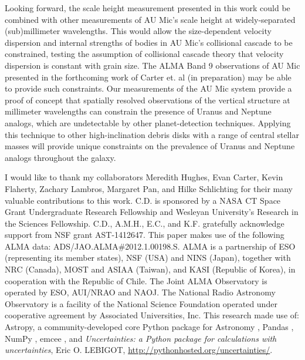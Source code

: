 \documentclass[12pt,oneside]{book}
\begin{document}
Looking forward, the scale height measurement presented in this work could be combined with other measurements of AU Mic's scale height at widely-separated (sub)millimeter wavelengths.
This would allow the size-dependent velocity dispersion and internal strengths of bodies in AU Mic's collisional cascade to be constrained, testing the assumption of collisional cascade theory that velocity dispersion is constant with grain size.
The ALMA Band 9 observations of AU Mic presented in the forthcoming work of Carter et. al (in preparation) may be able to provide such constraints.
Our measurements of the AU Mic system provide a proof of concept that spatially resolved observations of the vertical structure at millimeter wavelengths can constrain the presence of Uranus and Neptune analogs, which are undetectable by other planet-detection techniques.  
Applying this technique to other high-inclination debris disks with a range of central stellar masses will provide unique constraints on the prevalence of Uranus and Neptune analogs throughout the galaxy.

\medskip
\bigskip\bigskip
\bigskip
I would like to thank my collaborators Meredith Hughes, Evan Carter, Kevin Flaherty, Zachary Lambros, Margaret Pan, and Hilke Schlichting for their many valuable contributions to this work.
C.D. is sponsored by a NASA CT Space Grant Undergraduate Research Fellowship and Wesleyan University's Research in the Sciences Fellowship.  
C.D., A.M.H., E.C., and K.F. gratefully acknowledge support from NSF grant AST-1412647.  
This paper makes use of the following ALMA data:  ADS/JAO.ALMA\#2012.1.00198.S.  
ALMA is a partnership of ESO (representing its member states), NSF (USA) and NINS (Japan), together with NRC (Canada), MOST and ASIAA (Taiwan), and KASI (Republic of Korea), in cooperation with the Republic of Chile.  
The Joint ALMA Observatory is operated by ESO, AUI/NRAO and NAOJ.  
The National Radio Astronomy Observatory is a facility of the National Science Foundation operated under cooperative agreement by Associated Universities, Inc.
This research made use of: Astropy, a community-developed core Python package for Astronomy \citep{astropy}, Pandas \citep{mckinney}, NumPy \citep{van2011numpy}, emcee \citep{foreman-mackey13}, and \textit{Uncertainties: a Python package for calculations with uncertainties}, Eric O. LEBIGOT, \url{http://pythonhosted.org/uncertainties/}.
\clearpage

\nocite{laplace}
\end{document}
